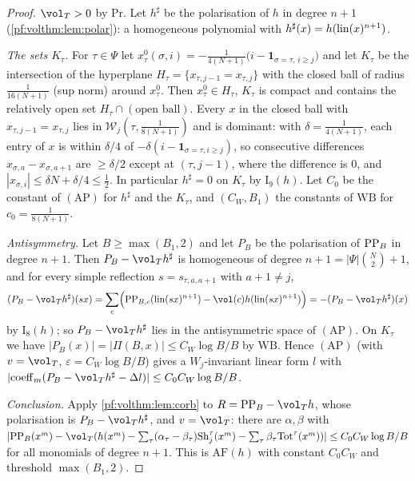 \begin{proof}
$\vol_T>0$ by $\mathrm{Pr}$. Let $h^\sharp$ be the polarisation of $h$ in degree $n+1$
(\cref{pf:volthm:lem:polar}): a homogeneous polynomial with $h^\sharp(x)=h(\mathrm{lin}(x)^{n+1})$.

\emph{The sets $K_\tau$.} For $\tau\in\Psi$ let $x^0_\tau(\sigma,i)=-\frac1{4(N+1)}\bigl(i-\mathbf 1_{\sigma=\tau,\,
i\ge j}\bigr)$ and let $K_\tau$ be the intersection of the hyperplane $H_\tau=\{x_{\tau,j-1}=x_{\tau,j}\}$ with the
closed ball of radius $\frac1{16(N+1)}$ (sup norm) around $x^0_\tau$. Then $x^0_\tau\in H_\tau$, $K_\tau$ is compact
and contains the relatively open set $H_\tau\cap(\text{open ball})$. Every $x$ in the closed ball with
$x_{\tau,j-1}=x_{\tau,j}$ lies in $\mathcal W_j(\tau,\frac1{8(N+1)})$ and is dominant: with
$\delta=\frac1{4(N+1)}$, each entry of $x$ is within $\delta/4$ of $-\delta(i-\mathbf 1_{\sigma=\tau,i\ge j})$, so
consecutive differences $x_{\sigma,a}-x_{\sigma,a+1}$ are $\ge\delta/2$ except at $(\tau,j-1)$, where the
difference is $0$, and $|x_{\sigma,i}|\le\delta N+\delta/4\le\frac12$. In particular $h^\sharp=0$ on $K_\tau$ by
$\mathrm{I}_9(h)$. Let $C_0$ be the constant of $(\mathrm{AP})$ for $h^\sharp$ and the $K_\tau$, and
$(C_W,B_1)$ the constants of $\mathrm{WB}$ for $c_0=\frac1{8(N+1)}$.

\emph{Antisymmetry.} Let $B\ge\max(B_1,2)$ and let $P_B$ be the polarisation of $\mathrm{PP}_B$ in degree $n+1$. Then
$P_B-\vol_Th^\sharp$ is homogeneous of degree $n+1=|\Psi|\binom N2+1$, and for every simple reflection
$s=s_{\tau,a,a+1}$ with $a+1\ne j$,
\[
(P_B-\vol_Th^\sharp)(sx)=\sum_c\Bigl(\volthmPP_{B,c}(\volthmlin(sx)^{n+1})-\vol(c)h(\volthmlin(sx)^{n+1})\Bigr)
=-(P_B-\vol_Th^\sharp)(x)
\]
by $\mathrm{I}_8(h)$; so $P_B-\vol_Th^\sharp$ lies in the antisymmetric space of $(\mathrm{AP})$.
On $K_\tau$ we have $|P_B(x)|=|\Pi(B,x)|\le C_W\log B/B$ by $\mathrm{WB}$. Hence
$(\mathrm{AP})$ (with $v=\vol_T$, $\varepsilon=C_W\log B/B$) gives a $W_j$-invariant linear form
$l$ with $|\mathrm{coeff}_m(P_B-\vol_Th^\sharp-\Delta l)|\le C_0C_W\log B/B$.

\emph{Conclusion.} Apply \cref{pf:volthm:lem:corb} to $R=\volthmPP_B-\vol_T h$, whose polarisation is
$P_B-\vol_Th^\sharp$, and $v=\vol_T$: there are $\alpha,\beta$ with
$|\volthmPP_B(x^m)-\vol_T(h(x^m)-\sum_\tau(\alpha_\tau-\beta_\tau)\volthmSh_j^\tau(x^m)-\sum_\tau\beta_\tau
\volthmTot^\tau(x^m))|\le C_0C_W\log B/B$ for all monomials of degree $n+1$. This is $\mathrm{AF}(h)$ with
constant $C_0C_W$ and threshold $\max(B_1,2)$.
\end{proof}

